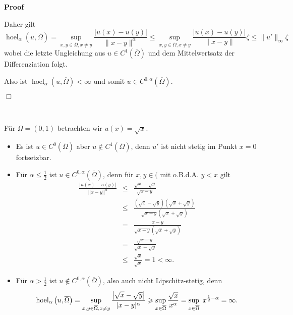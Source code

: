 \documentclass{book}
\newcommand{\nobracket}{}
\newcommand{\tmop}[1]{\ensuremath{\operatorname{#1}}}
\newenvironment{itemizedot}{\begin{itemize} \renewcommand{\labelitemi}{$\bullet$}\renewcommand{\labelitemii}{$\bullet$}\renewcommand{\labelitemiii}{$\bullet$}\renewcommand{\labelitemiv}{$\bullet$}}{\end{itemize}}
\newenvironment{proof}{\noindent\textbf{Proof\ }}{\hspace*{\fill}$\Box$\medskip}
\begin{document}
\begin{proof}
\begin{itemizedot}
    Daher gilt
    \[ \tmop{hoel}_{\alpha} \left( u, \overline{\Omega} \right) = \sup_{x, y
       \in \overline{\Omega}, x \neq y} \frac{| u (x) - u (y) |}{\| x - y
       \|^{\alpha}} \leqslant \sup_{x, y \in \overline{\Omega}, x \neq y}
       \frac{| u (x) - u (y) |}{\| x - y \|} \zeta \leqslant \| u' \|_{\infty}
       \zeta \]
    wobei die letzte Ungleichung aus $u \in C^1 \left( \overline{\Omega}
    \right)$ und dem Mittelwertsatz der Differenziation folgt.
    
    Also ist $\tmop{hoel}_{\alpha} \left( u, \overline{\Omega} \right) <
    \infty$ und somit $u \in C^{0, \alpha} \left( \overline{\Omega} \right)$.
  \end{itemizedot}
\end{proof}

\begin{example*}
  \
  
  F{\"u}r $\Omega = (0, 1)$ betrachten wir $u (x) = \sqrt{x}$.
  \begin{itemizedot}
    \item Es ist $u \in C^0 \left( \overline{\Omega} \right)$ aber $u \notin
    C^1 \left( \overline{\Omega} \right)$, denn $u'$ ist nicht stetig im Punkt
    $x = 0$ fortsetzbar.
    
    \item F{\"u}r $\alpha \leq \frac{1}{2}$ ist $u \in C^{0, \alpha} \left(
    \overline{\Omega} \right)$, denn f{\"u}r $x, y \in (\nobracket$ mit
    o.B.d.A. $y < x$ gilt
    \begin{eqnarray*}
      \frac{| u (x) - u (y) |}{| | x - y | |^{\alpha}} & \leqslant &
      \frac{\sqrt{x} - \sqrt{y}}{\sqrt{x - y}}\\
      & \leqslant & \frac{\left( \sqrt{x} - \sqrt{y} \right) \left( \sqrt{x}
      + \sqrt{y} \right)}{\sqrt{x - y} \left( \sqrt{x} + \sqrt{y} \right)}\\
      & = & \frac{x - y}{\sqrt{x - y} \left( \sqrt{x} + \sqrt{y} \right)}\\
      & = & \frac{\sqrt{x - y}}{\sqrt{x} + \sqrt{y}}\\
      & \leqslant & \frac{\sqrt{x}}{\sqrt{x}} = 1 < \infty .
    \end{eqnarray*}
    \item F{\"u}r $\alpha > \frac{1}{2}$ ist $u \notin C^{0, \alpha} \left(
    \overline{\Omega} \right)$, also auch nicht Lipschitz-stetig, denn
    \[ \tmop{hoel}_{\alpha} \left( u, \overline{\Omega} \right) = \sup_{x, y
       \in \overline{\Omega}, x \neq y} \frac{\left| \sqrt{x} - \sqrt{y}
       \right|}{| x - y |^{\alpha}} \geqslant \sup_{x \in \overline{\Omega}}
       \frac{\sqrt{x}}{x^{\alpha}} = \sup_{x \in \overline{\Omega}}
       \hspace{0.3em} x^{\frac{1}{2} - \alpha} = \infty . \]
  \end{itemizedot}
\end{example*}
\end{document}
